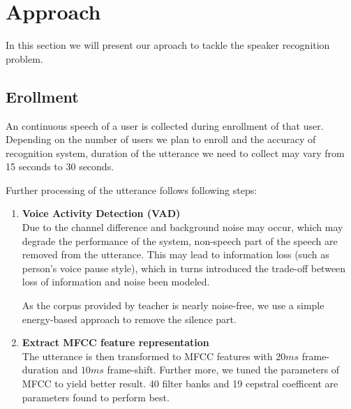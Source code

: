 \section{Approach}
	In this section we will present our aproach to tackle the speaker recognition problem.
\subsection{Erollment}
	\label{sec:approach_enrollment}
	An continuous speech of a user is collected during enrollment of that user. Depending on
	the number of users we plan to enroll and the accuracy of recognition system, duration
	of the utterance we need to collect may vary from 15 seconds to 30 seconds.

	Further processing of the utterance follows following steps:
	\begin{enumerate}
		\item \textbf{Voice Activity Detection (VAD)} \\
			Due to the channel difference and background noise may occur, which
			may degrade the performance of the system, non-speech part of the
			speech are removed from the utterance. This may lead to
			information loss (such as person's voice pause style), which in
			turns introduced the trade-off between loss of information and
			noise been modeled.

			As the corpus provided by teacher is nearly noise-free, we use a
			simple energy-based approach to remove the silence part.

		\item \textbf{Extract MFCC feature representation} \\
			The utterance is then transformed to MFCC features with $20ms$
			frame-duration and $10ms$ frame-shift. Further more, we tuned the
			parameters of MFCC to yield better result. 40 filter banks and 19
			cepstral coefficent are parameters found to perform best.


\end{enumerate}
